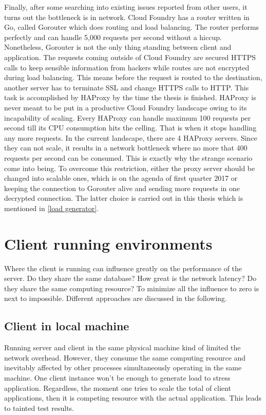 Finally, after some searching into existing issues reported from other users, it turns out the bottleneck is in network. Cloud Foundry has a router written in Go, called Gorouter  \citep{Gorouter} which does routing and load balancing. The router performs perfectly and can handle 5,000 requests per second without a hiccup. Nonetheless, Gorouter is not the only thing standing between client and application. The requests coming outside of Cloud Foundry are secured HTTPS calls to keep sensible information from hackers while routes are not encrypted during load balancing. This means before the request is routed to the destination, another server has to terminate SSL and change HTTPS calls to HTTP. This task is accomplished by \ac{HAProxy} \citep{HAProxy} by the time the thesis is finished. HAProxy is never meant to be put in a productive Cloud Foundry landscape owing to its incapability of scaling. Every HAProxy can handle maximum 100 requests per second till its CPU consumption hits the celling. That is when it stops handling any more requests. In the current landscape, there are 4 HAProxy servers. Since they can not scale, it results in a network bottleneck where no more that 400 requests per second can be consumed. This is exactly why the strange scenario come into being. To overcome this restriction, either the proxy server should be changed into scalable ones, which is on the agenda of first quarter 2017 or keeping the connection to Gorouter alive and sending more requests in one decrypted connection. The latter choice is carried out in this thesis which is mentioned in \ref{load generator}.


\section{ Client running environments}
Where the client is running can influence greatly on the performance of the server. Do they share the same database? How great is the network latency? Do they share the same computing resource? To minimize all the influence to zero is next to impossible. Different approaches are discussed in the following. 

\subsection{Client in local machine}
Running server and client in the same physical machine kind of limited the network overhead. However, they consume the same computing resource and inevitably affected by other processes simultaneously operating in the same machine. One client instance won't be enough to generate load to stress application. Regardless, the moment one tries to scale the total of client applications, then it is competing resource with the actual application. This leads to tainted test results.  
